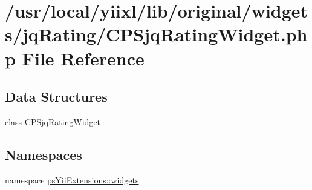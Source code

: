 \hypertarget{CPSjqRatingWidget_8php}{
\section{/usr/local/yiixl/lib/original/widgets/jqRating/CPSjqRatingWidget.php File Reference}
\label{CPSjqRatingWidget_8php}
}
\subsection*{Data Structures}
\begin{DoxyCompactItemize}
\item 
class \hyperlink{classCPSjqRatingWidget}{CPSjqRatingWidget}
\end{DoxyCompactItemize}
\subsection*{Namespaces}
\begin{DoxyCompactItemize}
\item 
namespace \hyperlink{namespacepsYiiExtensions_1_1widgets}{psYiiExtensions::widgets}
\end{DoxyCompactItemize}

